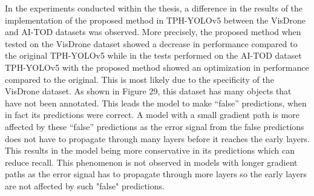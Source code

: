 In the experiments conducted within the thesis, a difference in the results of the
implementation of the proposed method in TPH-YOLOv5 between the VisDrone
and AI-TOD datasets was observed. More precisely, the proposed method when
tested on the VisDrone dataset showed a decrease in performance compared to
the original TPH-YOLOv5 while in the tests performed on the AI-TOD dataset
TPH-YOLOv5 with the proposed method showed an optimization in performance
compared to the original.
This is most likely due to the specificity of the VisDrone dataset. As shown in
Figure 29, this dataset has many objects that have not been annotated. This leads
the model to make “false” predictions, when in fact its predictions were correct.
A model with a small gradient path is more affected by these “false” predictions
as the error signal from the false predictions does not have to propagate through
many layers before it reaches the early layers. This results in the model being
more conservative in its predictions which can reduce recall. This phenomenon
is not observed in models with longer gradient paths as the error signal has to
propagate through more layers so the early layers are not affected by such "false"
predictions.


